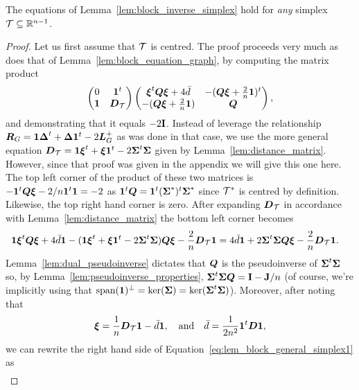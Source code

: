 \begin{theorem}
	\label{thm:block_general_simplex}
	The equations of Lemma~\ref{lem:block_inverse_simplex} hold for \emph{any} simplex $\mathcal{T}\subseteq\mathbb{R}^{n-1}$. 
\end{theorem}
\begin{proof}
	Let us first assume that $\mathcal{T}$ is centred. 
	The proof proceeds very much as  does  that of Lemma~\ref{lem:block_equation_graph}, by computing the matrix product  
	\[\begin{pmatrix}
	0 & \vb{1}^t \\
	\vb{1} & \vb*{D}_{\mathcal{T}}
	\end{pmatrix} \begin{pmatrix}
	\vb*{\xi}^t\vb*{Q}\vb*{\xi} + 4\bar{d}  &  -(\vb*{Q}\vb*{\xi}  + \frac{2}{n}\vb{1})^t  \\
	-(\vb*{Q}\vb*{\xi}  + \frac{2}{n}\vb{1}) &  \vb*{Q}
	\end{pmatrix},\] and demonstrating that it equals $-2\vb{I}$. Instead of leverage  the relationship $\vb*{R}_G=\vb{1}\vb*{\Delta}^t+\vb*{\Delta}\vb{1}^t - 2\vb*{L}_G^+$ as was done  in that case, we use the more general equation $\vb*{D}_{\mathcal{T}} = \vb{1}\vb*{\xi}^t+\vb*{\xi}\vb{1}^t - 2\boldsymbol{\Sigma}^t\boldsymbol{\Sigma}$ given by Lemma~\ref{lem:distance_matrix}. However, since that proof  was given  in the appendix we will give this one here.  The top left corner of  the product of these two matrices is $-\vb{1}^t\vb*{Q}\vb*{\xi}-2/n \vb{1}^t\vb{1} = -2$ as $\vb{1}^t\vb*{Q} = \vb{1}^t(\boldsymbol{\Sigma}^*)^t\boldsymbol{\Sigma}^*$ since $\mathcal{T}^*$ is centred by definition. Likewise,  the top right  hand corner is zero.  After expanding $\vb*{D}_{\mathcal{T}}$  in accordance with Lemma~\ref{lem:distance_matrix} the bottom left  corner becomes 
	\begin{align}
	&\vb{1}\vb*{\xi}^t\vb*{Q}\vb*{\xi}+4\bar{d}\vb{1} - (\vb{1}\vb*{\xi}^t+\vb*{\xi}\vb{1}^t - 2\boldsymbol{\Sigma}^t\boldsymbol{\Sigma})\vb*{Q}\vb*{\xi} -\frac{2}{n}\vb*{D}_{\mathcal{T}}\vb{1} = 4\bar{d}\vb{1} + 2\boldsymbol{\Sigma}^t\boldsymbol{\Sigma}\vb*{Q}\vb*{\xi}  -\frac{2}{n}\vb*{D}_{\mathcal{T}}\vb{1}. \label{eq:lem_block_general_simplex1}
	\end{align}
	Lemma~\ref{lem:dual_pseudoinverse} dictates that $\vb*{Q}$ is the pseudoinverse of $\boldsymbol{\Sigma}^t\boldsymbol{\Sigma}$ so, by Lemma~\ref{lem:pseudoinverse_properties}, $\boldsymbol{\Sigma}^t\boldsymbol{\Sigma}\vb*{Q}=\vb{I}-\vb{J}/n$ (of course, we're implicitly using that $\textnormal{span}(\vb{1})^\perp = \ker(\boldsymbol{\Sigma})=\ker(\boldsymbol{\Sigma}^t\boldsymbol{\Sigma})$). 
	Moreover, after noting that 
	\begin{equation*}
	\vb*{\xi} = \frac{1}{n}\vb*{D}_{\mathcal{T}}\vb{1} -\bar{d}\vb{1},\quad \text{and}\quad  \bar{d} = \frac{1}{2n^2}\vb{1}^t\vb*{D}\vb{1},
	\end{equation*}
	we can  rewrite the right  hand side of Equation~\eqref{eq:lem_block_general_simplex1} as 
	\begin{align*}

\end{align*}
\end{proof}
